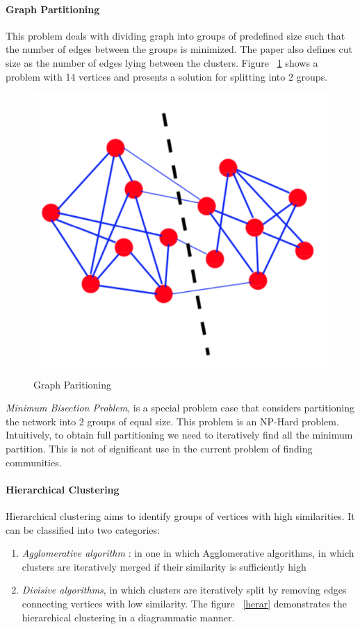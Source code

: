 \paragraph{Graph Partitioning}
This problem deals with dividing graph into groups of predefined size such that the number of edges between the groups is minimized. The paper \cite{communitypaper}  also defines cut size as the number of edges lying between the clusters.  Figure ~\ref{grapar} shows a problem with 14 vertices and presents a solution for splitting into 2 groups. 
\begin{figure}[H]
\centering
\includegraphics[scale=0.3]{graphpart.png}
\caption{\label{grapar}Graph Paritioning \cite{communitypaper}}

\end{figure}
\par \textit{Minimum Bisection Problem}, is a special problem case that considers partitioning the network into 2 groups of equal size. This problem is an NP-Hard problem. Intuitively, to obtain full partitioning we need to iteratively find all the minimum partition. This is not of significant use in the current problem of finding communities. 
\paragraph{Hierarchical Clustering}
Hierarchical clustering aims to identify groups of vertices with high similarities. It can be classified into two categories:
 \begin{enumerate}
\item \textit{Agglomerative algorithm} : in one in which Agglomerative algorithms, in which clusters are iteratively merged if their similarity is sufficiently
high
\item \textit{Divisive algorithms}, in which clusters are iteratively
split by removing edges connecting vertices with
low similarity.
The figure ~\ref{herar} demonstrates the hierarchical clustering in a diagrammatic manner.
\end{enumerate} 

